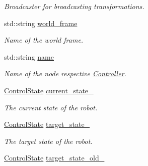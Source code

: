 \begin{DoxyCompactItemize}
\begin{DoxyCompactList}\small\item\em Broadcaster for broadcasting transformations. \end{DoxyCompactList}\item 
std\+::string \hyperlink{classController_ae01171e69d9b735e44964662275fc77c}{world\+\_\+frame}\hypertarget{classController_ae01171e69d9b735e44964662275fc77c}{}\label{classController_ae01171e69d9b735e44964662275fc77c}

\begin{DoxyCompactList}\small\item\em Name of the world frame. \end{DoxyCompactList}\item 
std\+::string \hyperlink{classController_af81f22d8b64d915769acfb8e8d89e0c8}{name}\hypertarget{classController_af81f22d8b64d915769acfb8e8d89e0c8}{}\label{classController_af81f22d8b64d915769acfb8e8d89e0c8}

\begin{DoxyCompactList}\small\item\em Name of the node respective \hyperlink{classController}{Controller}. \end{DoxyCompactList}\item 
\hyperlink{structController_1_1ControlState}{Control\+State} \hyperlink{classController_aaca736f25e7da33272ded507e0c8057f}{current\+\_\+state\+\_\+}\hypertarget{classController_aaca736f25e7da33272ded507e0c8057f}{}\label{classController_aaca736f25e7da33272ded507e0c8057f}

\begin{DoxyCompactList}\small\item\em The current state of the robot. \end{DoxyCompactList}\item 
\hyperlink{structController_1_1ControlState}{Control\+State} \hyperlink{classController_a8412c8448970cf820f932cff02d69d33}{target\+\_\+state\+\_\+}\hypertarget{classController_a8412c8448970cf820f932cff02d69d33}{}\label{classController_a8412c8448970cf820f932cff02d69d33}

\begin{DoxyCompactList}\small\item\em The target state of the robot. \end{DoxyCompactList}\item 
\hyperlink{structController_1_1ControlState}{Control\+State} \hyperlink{classController_a9980fe18d872ac0522a2323346b3f6b2}{target\+\_\+state\+\_\+old\+\_\+}\hypertarget{classController_a9980fe18d872ac0522a2323346b3f6b2}{}\label{classController_a9980fe18d872ac0522a2323346b3f6b2}


\end{DoxyCompactItemize}
